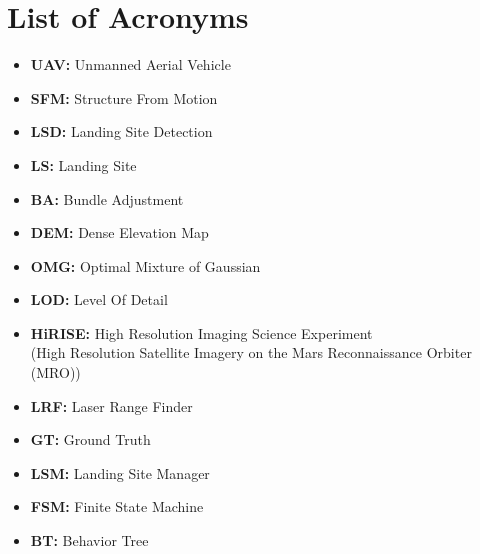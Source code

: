 \chapter*{List of Acronyms}

\begin{itemize}
    \item \textbf{UAV: } Unmanned Aerial Vehicle
    \item \textbf{SFM: } Structure From Motion
    \item \textbf{LSD: } Landing Site Detection
    \item \textbf{LS: } Landing Site 
    \item \textbf{BA: } Bundle Adjustment
    \item \textbf{DEM: } Dense Elevation Map
    \item \textbf{OMG: } Optimal Mixture of Gaussian
    \item \textbf{LOD: } Level Of Detail
    \item \textbf{HiRISE: } High Resolution Imaging Science Experiment \\(High Resolution Satellite Imagery on the Mars Reconnaissance Orbiter (MRO))
    \item \textbf{LRF: } Laser Range Finder
    \item \textbf{GT: } Ground Truth
    \item \textbf{LSM: } Landing Site Manager
    \item \textbf{FSM: } Finite State Machine
    \item \textbf{BT: } Behavior Tree
\end{itemize}
